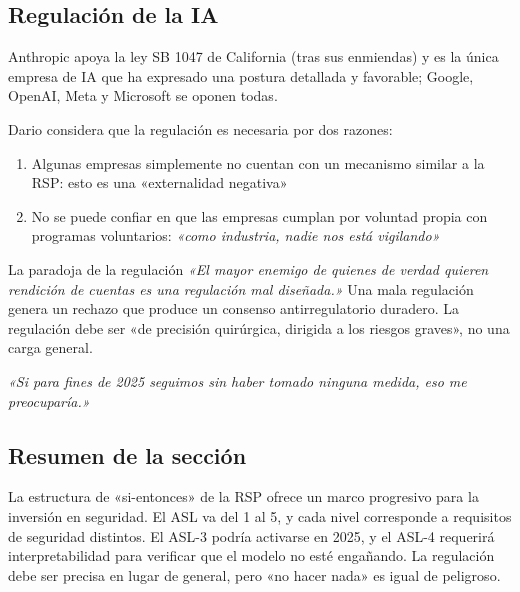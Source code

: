 \subsection{Regulación de la IA}

Anthropic apoya la ley SB 1047 de California (tras sus enmiendas) y es la única empresa de IA que ha expresado una postura detallada y favorable; Google, OpenAI, Meta y Microsoft se oponen todas.

Dario considera que la regulación es necesaria por dos razones:
\begin{enumerate}
    \item Algunas empresas simplemente no cuentan con un mecanismo similar a la RSP: esto es una «externalidad negativa»
    \item No se puede confiar en que las empresas cumplan por voluntad propia con programas voluntarios: \textit{«como industria, nadie nos está vigilando»}
\end{enumerate}

\begin{warningbox}{La paradoja de la regulación}
\textit{«El mayor enemigo de quienes de verdad quieren rendición de cuentas es una regulación mal diseñada.»} Una mala regulación genera un rechazo que produce un consenso antirregulatorio duradero. La regulación debe ser «de precisión quirúrgica, dirigida a los riesgos graves», no una carga general.

\textit{«Si para fines de 2025 seguimos sin haber tomado ninguna medida, eso me preocuparía.»}
\end{warningbox}

\subsection{Resumen de la sección}

La estructura de «si-entonces» de la RSP ofrece un marco progresivo para la inversión en seguridad. El ASL va del 1 al 5, y cada nivel corresponde a requisitos de seguridad distintos. El ASL-3 podría activarse en 2025, y el ASL-4 requerirá interpretabilidad para verificar que el modelo no esté engañando. La regulación debe ser precisa en lugar de general, pero «no hacer nada» es igual de peligroso.
